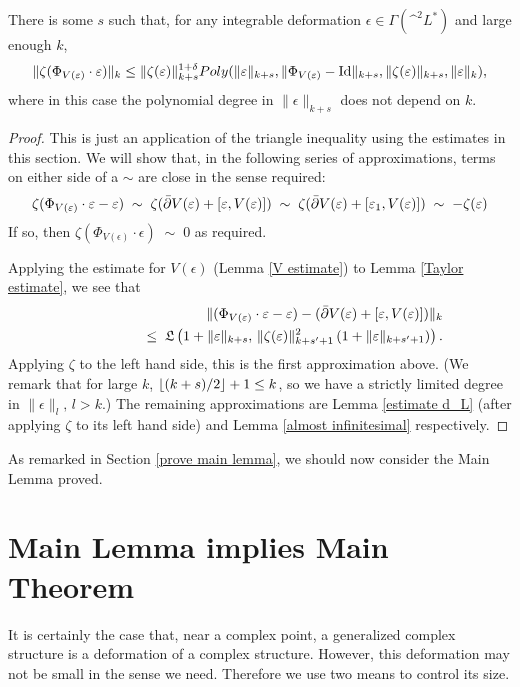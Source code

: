\documentclass{article}
\begin{document}
\begin{lem}
There is some $s$ such that, for any integrable deformation $\epsilon \in \Gamma(\^ ^2 L^*)$ and large enough $k$,
$$\|\zeta(\Phi_{V(\varepsilon)} \cdot \varepsilon)\|_k \leq \|\zeta(\varepsilon)\|_{k+s}^{1+\delta} Poly(\|\varepsilon\|_{k+s}, \|\Phi_{V(\varepsilon)}-\textrm{Id}\|_{k+s}, \|\zeta(\varepsilon)\|_{k+s}, \|\varepsilon\|_k),$$
where in this case the polynomial degree in $\|\epsilon\|_{k+s}$ does not depend on $k$.
\end{lem}
\begin{proof}
This is just an application of the triangle inequality using the estimates in this section.  We will show that, in the following series of approximations, terms on either side of a $\sim$ are close in the sense required:
$$\zeta(\Phi_{V(\varepsilon)}\cdot\varepsilon - \varepsilon)
\;\sim\; \zeta(\bar{\partial} V(\varepsilon) + [\varepsilon,V(\varepsilon)])
\;\sim\; \zeta(\bar{\partial} V(\varepsilon) + [\varepsilon_1,V(\varepsilon)])
\;\sim\; -\zeta(\varepsilon)$$
If so, then $\zeta(\Phi_{V(\epsilon)}\cdot\epsilon) \;\sim\; 0$ as required.

Applying the estimate for $V(\epsilon)$ (Lemma \ref{V estimate}) to Lemma \ref{Taylor estimate}, we see that
\begin{eqnarray*}
& & \|(\Phi_{V(\epsilon)}\cdot\epsilon - \epsilon) - (\bar\del V(\epsilon) + [\epsilon,V(\epsilon)])\|_k \\
& & \qquad\qquad   \leq\; \LP\left(1+\|\epsilon\|_{k+s},\, \|\zeta(\epsilon)\|_{k+s'+1}^2\,(1+\|\epsilon\|_{k+s'+1})\right).%
\end{eqnarray*}
Applying $\zeta$ to the left hand side, this is the first approximation above.  (We remark that for large $k$, $\left\lfloor (k+s)/2 \right\rfloor+1 \leq k$, so we have a strictly limited degree in $\|\epsilon\|_l,\, l>k$.)  The remaining approximations are Lemma \ref{estimate d_L} (after applying $\zeta$ to its left hand side) and Lemma \ref{almost infinitesimal} respectively. 
\end{proof}

As remarked in Section \ref{prove main lemma}, we should now consider the Main Lemma proved.

\section{Main Lemma implies Main Theorem}\label{lemma implies theorem}

It is certainly the case that, near a complex point, a generalized complex structure is a deformation of a complex structure.  However, this deformation may not be small in the sense we need.  Therefore we use two means to control its size.
\end{document}
